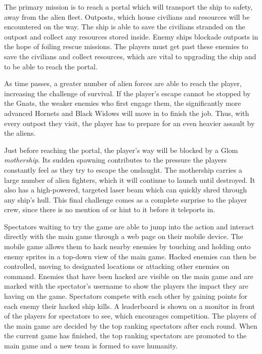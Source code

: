 \documentclass[a4paper,11pt]{article}
\begin{document}
The primary mission is to reach a portal which will transport the ship to safety, away from the alien fleet. Outposts, which house civilians and resources will be encountered on the way. The ship is able to save the civilians stranded on the outpost and collect any resources stored inside. Enemy ships blockade outposts in the hope of foiling rescue missions. The players must get past these enemies to save the civilians and collect resources, which are vital to upgrading the ship and to be able to reach the portal.

As time passes, a greater number of alien forces are able to reach the player, increasing the challenge of survival. If the player's escape cannot be stopped by the Gnats, the weaker enemies who first engage them, the significantly more advanced Hornets and Black Widows will move in to finish the job. Thus, with every outpost they visit, the player has to prepare for an even heavier assault by the aliens.

Just before reaching the portal, the player's way will be blocked by a Glom \emph{mothership}. Its sudden spawning contributes to the pressure the players constantly feel as they try to escape the onslaught. The mothership carries a large number of alien fighters, which it will continue to launch until destroyed. It also has a high-powered, targeted laser beam which can quickly shred through any ship's hull. This final challenge comes as a complete surprise to the player crew, since there is no mention of or hint to it before it teleports in.

Spectators waiting to try the game are able to jump into the action and interact directly with the main game through a web page on their mobile device. The mobile game allows them to hack nearby enemies by touching and holding onto enemy sprites in a top-down view of the main game. Hacked enemies can then be controlled, moving to designated locations or attacking other enemies on command. Enemies that have been hacked are visible on the main game and are marked with the spectator’s username to show the players the impact they are having on the game. Spectators compete with each other by gaining points for each enemy their hacked ship kills. A leaderboard is shown on a monitor in front of the players for spectators to see, which encourages competition. The players of the main game are decided by the top ranking spectators after each round. When the current game has finished, the top ranking spectators are promoted to the main game and a new team is formed to save humanity.
\end{document}
